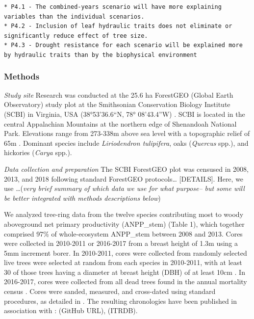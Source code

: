 \documentclass[]{article}
\begin{document}
\begin{verbatim}
* P4.1 - The combined-years scenario will have more explaining variables than the individual scenarios.
* P4.2 - Inclusion of leaf hydraulic traits does not eliminate or significantly reduce effect of tree size.
* P4.3 - Drought resistance for each scenario will be explained more by hydraulic traits than by the biophysical environment
\end{verbatim}

\hypertarget{methods}{%
\subsubsection{Methods}\label{methods}}

\emph{Study site} Research was conducted at the 25.6 ha ForestGEO
(Global Earth Observatory) study plot at the Smithsonian Conservation
Biology Institute (SCBI) in Virginia, USA (38°53'36.6``N, 78°
08'43.4''W) \citep{andersonteixeira_ctfs-forestgeo:_2015}. SCBI is
located in the central Appalachian Mountains at the northern edge of
Shenandoah National Park. Elevations range from 273-338m above sea level
\citep{gonzalezakre_patterns_2016} with a topographic relief of 65m
\citep{bourg_initial_2013}. Dominant species include \emph{Liriodendron
tulipifera}, oaks (\emph{Quercus} spp.), and hickories (\emph{Carya}
spp.).

\emph{Data collection and preparation} The SCBI ForestGEO plot was
censused in 2008, 2013, and 2018 following standard ForestGEO
protocols\ldots{} {[}DETAILS{]}. Here, we use \ldots(\emph{very brief
summary of which data we use for what purpose-- but some will be better
integrated with methods descriptions below})

We analyzed tree-ring data from the twelve species contributing most to
woody aboveground net primary productivity (ANPP\_stem) (Table 1), which
together comprised 97\% of whole-ecosystem ANPP\_stem between 2008 and
2013. Cores were collected in 2010-2011 or 2016-2017 from a breast
height of 1.3m using a 5mm increment borer. In 2010-2011, cores were
collected from randomly selected live trees were selected at random from
each species in 2010-2011, with at least 30 of those trees having a
diameter at breast height (DBH) of at least 10cm
\citep{bourg_initial_2013}. In 2016-2017, cores were collected from all
dead trees found in the annual mortality census
\citep{gonzalezakre_patterns_2016}. Cores were sanded, measured, and
cross-dated using standard procedures, as detailed in
\citep{helcoski_growing_2019}. The resulting chronologies have been
published in association with \citep{helcoski_growing_2019}: (GitHub
URL), (ITRDB).
\end{document}
